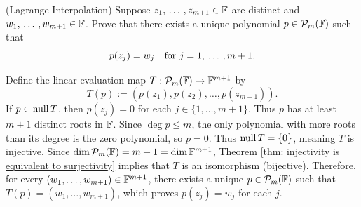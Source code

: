 \begin{xrcs}
  (Lagrange Interpolation) Suppose $z_1, {\, \ldots \,\,}, z_{m+1} \in \mathbb{F}$ are distinct and $w_1, {\, \ldots \,\,}, w_{m+1} \in \mathbb{F}$. Prove that there exists a unique polynomial $p \in \mathcal{P}_m(\mathbb{F})$ such that
  \begin{equation}
    p(z_j) = w_j \quad \text{for } j = 1, {\, \ldots \,\,}, m+1.
  \end{equation}
  \begin{xprf}
    Define the linear evaluation map $T: \mathcal{P}_m(\mathbb{F}) \to \mathbb{F}^{m+1}$ by
    \[
      T(p) := (p(z_1), p(z_2), \dots, p(z_{m+1})).
    \]
    If $p \in \operatorname{null} T$, then $p(z_j) = 0$ for each $j \in \{1, \dots, m+1\}$.
    Thus $p$ has at least $m+1$ distinct roots in $\mathbb{F}$.
    Since $\deg p \le m$, the only polynomial with more roots than its degree is the zero polynomial, so $p = 0$.
    Thus $\operatorname{null} T = \{0\}$, meaning $T$ is injective.
    Since $\dim \mathcal{P}_m(\mathbb{F}) = m+1 = \dim \mathbb{F}^{m+1}$, Theorem \ref{thm: injectivity is equivalent to surjectivity} implies that $T$ is an isomorphism (bijective).
    Therefore, for every $(w_1, \dots, w_{m+1}) \in \mathbb{F}^{m+1}$, there exists a unique $p \in \mathcal{P}_m(\mathbb{F})$ such that $T(p) = (w_1, \dots, w_{m+1})$, which proves $p(z_j) = w_j$ for each $j$.
  \end{xprf}
\end{xrcs}

